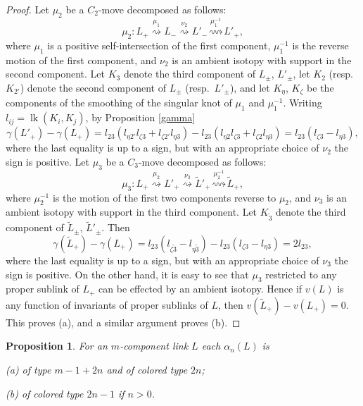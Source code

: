 \documentclass[a4paper,12pt,reqno,oneside]{amsart} %
\theoremstyle{plain}
\newtheorem{proposition}[theorem]{Proposition}
\theoremstyle{definition}
\theoremstyle{named}
\renewcommand{\:}{\colon}
\DeclareMathOperator{\lk}{lk}
\begin{document}
\begin{proof} Let $\mu_2$ be a $C_2$-move decomposed as follows:
\[\mu_2\:L_+\overset{\mu_1}{\rightsquigarrow} L_-\overset{\nu_2}{\rightsquigarrow} L'_-\overset{\mu_1^{-1}}{\rightsquigarrow} L'_+,\]
where $\mu_1$ is a positive self-intersection of the first component, $\mu_1^{-1}$ is the reverse motion of the first component, 
and $\nu_2$ is an ambient isotopy with support in the second component.
Let $K_3$ denote the third component of $L_\pm$, $L'_\pm$, let $K_2$ (resp.\ $K_{2'}$) denote the second component of $L_\pm$ (resp.\ $L'_\pm$),
and let $K_\eta$, $K_\zeta$ be the components of the smoothing of the singular knot of $\mu_1$ and $\mu_1^{-1}$.
Writing $l_{ij}=\lk(K_i,K_j)$, by Proposition \ref{gamma} \[\gamma(L'_+)-\gamma(L_+)=l_{23}(l_{\eta2'}l_{\zeta3}+l_{\zeta2'}l_{\eta3})-
l_{23}(l_{\eta2}l_{\zeta3}+l_{\zeta2}l_{\eta3})=l_{23}(l_{\zeta3}-l_{\eta3}),\]
where the last equality is up to a sign, but with an appropriate choice of $\nu_2$ the sign is positive.
Let $\mu_3$ be a $C_3$-move decomposed as follows:
\[\mu_3\:L_+\overset{\mu_2}{\rightsquigarrow} L'_+\overset{\nu_3}{\rightsquigarrow} \tilde L'_+\overset{\mu_2^{-1}}{\rightsquigarrow}\tilde L_+,\]
where $\mu_2^{-1}$ is the motion of the first two components reverse to $\mu_2$, and $\nu_3$ is an ambient isotopy with support in the third component.
Let $K_{\tilde 3}$ denote the third component of $\tilde L_\pm$, $\tilde L'_\pm$.
Then \[\gamma(\tilde L_+)-\gamma(L_+)=l_{23}(l_{\zeta\tilde 3}-l_{\eta\tilde 3})-l_{23}(l_{\zeta3}-l_{\eta3})=2l_{23},\]
where the last equality is up to a sign, but with an appropriate choice of $\nu_3$ the sign is positive.
On the other hand, it is easy to see that $\mu_3$ restricted to any proper sublink of $L_+$ can be effected by an ambient isotopy.
Hence if $v(L)$ is any function of invariants of proper sublinks of $L$, then $v(\tilde L_+)-v(L_+)=0$.
This proves (a), and a similar argument proves (b).
\end{proof}

\begin{proposition} \label{reduced-coefficients2}
For an $m$-component link $L$ each $\alpha_n(L)$ is 

(a) of type $m-1+2n$ and of colored type $2n$;

(b) of colored type $2n-1$ if $n>0$.
\end{proposition}
\end{document}
